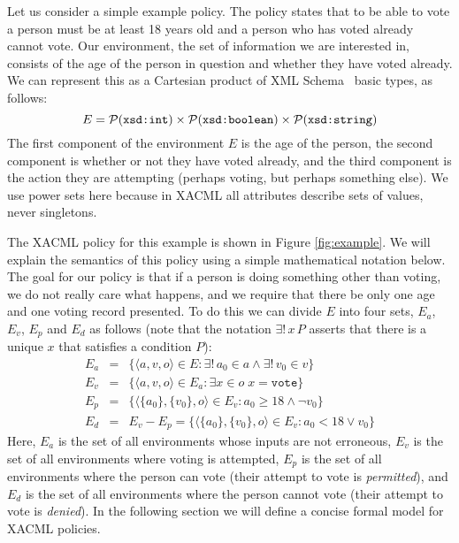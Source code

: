 Let us consider a simple example policy. 
The policy states that to be able to vote a person must be at least 18 years old
and a person who has voted already cannot vote. 
Our environment, the set of
information we are interested in, consists of the age of the person in
question and whether they have voted already.  We can represent this
as a Cartesian product of XML Schema~\cite{xmlschema} basic types,
as follows:
\begin{equation*}
  E = \mathcal{P} (\text{\texttt{xsd:int}}) \times \mathcal{P} (\text{\texttt{xsd:boolean}})
  \times \mathcal{P} (\text{\texttt{xsd:string}})
  \label{eqn:env}
\end{equation*}
The first component of the environment $E$ is the age of the
person, the second component is whether or not they have voted
already, and the third component is the action they are attempting
(perhaps voting, but perhaps something else).  We use power sets here
because in XACML all attributes describe sets of values, never
singletons.

The XACML policy for this
example is shown in Figure \ref{fig:example}.
We will explain the semantics of this policy
using a simple mathematical notation below. 
The goal for our policy is that if a person is doing something other than
voting, we do not really care what happens, and we require that there
be only one age and one voting record presented.  To do this we can
divide $E$ into four sets, $E_a$, $E_v$, $E_p$ and $E_d$ as follows
(note that the notation $\exists ! \, x \, P$ asserts that there is a
unique $x$ that satisfies a condition $P$):
\begin{eqnarray*}
  E_a & = & \{ \langle a, v, o \rangle \in E : \exists ! \, a_0 \in a 
  \wedge \exists ! \, v_0 \in v \} \\
  E_v & = & \{ \langle a, v, o \rangle \in E_a : \exists x \in o \; 
  x = \texttt{vote} \} \\
  E_p & = & \{ \langle \{a_0\}, \{v_0\}, o \rangle \in E_v : a_0 \geq 18 
  \wedge \neg v_0 \} \\
  E_d & = & E_v - E_p 
   =  \{ \langle \{a_0\}, \{v_0\}, o \rangle \in E_v : a_0 < 18 \vee v_0 \}
\end{eqnarray*}
Here, $E_a$ is the set of all environments whose inputs are not
erroneous, $E_v$ is the set of all environments where voting is
attempted, $E_p$ is the set of all environments where the person can
vote (their attempt to vote is \emph{permitted}), and $E_d$ is the set
of all environments where the person cannot vote (their attempt to
vote is \emph{denied}).  
In the following
section we will define a concise formal model for XACML policies.

